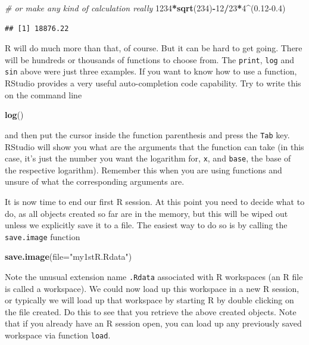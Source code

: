 \documentclass[
]{article}
\newenvironment{Shaded}{\begin{snugshade}}{\end{snugshade}}
\newcommand{\AttributeTok}[1]{\textcolor[rgb]{0.13,0.29,0.53}{#1}}
\newcommand{\CommentTok}[1]{\textcolor[rgb]{0.56,0.35,0.01}{\textit{#1}}}
\newcommand{\DecValTok}[1]{\textcolor[rgb]{0.00,0.00,0.81}{#1}}
\newcommand{\FloatTok}[1]{\textcolor[rgb]{0.00,0.00,0.81}{#1}}
\newcommand{\FunctionTok}[1]{\textcolor[rgb]{0.13,0.29,0.53}{\textbf{#1}}}
\newcommand{\NormalTok}[1]{#1}
\newcommand{\SpecialCharTok}[1]{\textcolor[rgb]{0.81,0.36,0.00}{\textbf{#1}}}
\newcommand{\StringTok}[1]{\textcolor[rgb]{0.31,0.60,0.02}{#1}}
\begin{document}
\begin{Shaded}
\begin{Highlighting}[]
\CommentTok{\# or make any kind of calculation really}
\DecValTok{1234}\SpecialCharTok{*}\FunctionTok{sqrt}\NormalTok{(}\DecValTok{234}\NormalTok{)}\SpecialCharTok{{-}}\DecValTok{12}\SpecialCharTok{/}\DecValTok{23}\SpecialCharTok{*}\DecValTok{4}\SpecialCharTok{\^{}}\NormalTok{(}\FloatTok{0.12{-}0.4}\NormalTok{)}
\end{Highlighting}
\end{Shaded}

\begin{verbatim}
## [1] 18876.22
\end{verbatim}

R will do much more than that, of course. But it can be hard to get
going. There will be hundreds or thousands of functions to choose from.
The \texttt{print}, \texttt{log} and \texttt{sin} above were just three
examples. If you want to know how to use a function, RStudio provides a
very useful auto-completion code capability. Try to write this on the
command line

\begin{Shaded}
\begin{Highlighting}[]
\FunctionTok{log}\NormalTok{()}
\end{Highlighting}
\end{Shaded}

and then put the cursor inside the function parenthesis and press the
\texttt{Tab} key. RStudio will show you what are the arguments that the
function can take (in this case, it's just the number you want the
logarithm for, \texttt{x}, and \texttt{base}, the base of the respective
logarithm). Remember this when you are using functions and unsure of
what the corresponding arguments are.

It is now time to end our first R session. At this point you need to
decide what to do, as all objects created so far are in the memory, but
this will be wiped out unless we explicitly save it to a file. The
easiest way to do so is by calling the \texttt{save.image} function

\begin{Shaded}
\begin{Highlighting}[]
\FunctionTok{save.image}\NormalTok{(}\AttributeTok{file=}\StringTok{"my1stR.Rdata"}\NormalTok{)}
\end{Highlighting}
\end{Shaded}

Note the unusual extension name \texttt{.Rdata} associated with R
workspaces (an R file is called a workspace). We could now load up this
workspace in a new R session, or typically we will load up that
workspace by starting R by double clicking on the file created. Do this
to see that you retrieve the above created objects. Note that if you
already have an R session open, you can load up any previously saved
workspace via function \texttt{load}.
\end{document}

